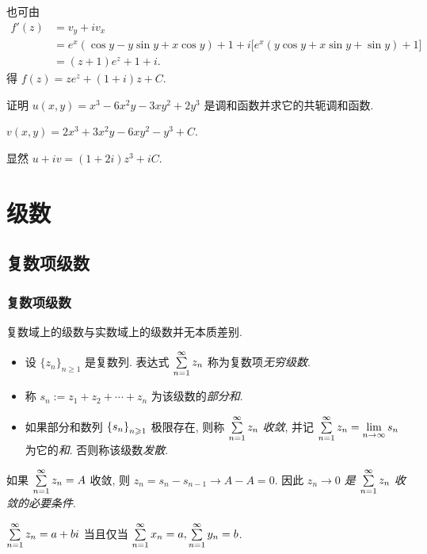 \documentclass[nocolor,theme=doremi,lang=cn,11pt,chinese,twoside,openright,usesamecnt]{elegantbook}
\begin{document}
也可由
\begin{align*}
	f'(z)&=v_y+iv_x\\
	&=e^x(\cos y-y\sin y+x\cos y)+1
	+i\bigl[e^x(y\cos y+x\sin y+\sin y)+1\bigr]\\
	&{=(z+1)e^z+1+i.}
\end{align*}
得 $f(z)=ze^z+(1+i)z+C$.
\begin{exercise}
	证明 $u(x,y)=x^3-6x^2y-3xy^2+2y^3$ 是调和函数并求它的共轭调和函数.
\end{exercise}

\begin{answer}
	$v(x,y)=2x^3+3x^2y-6xy^2-y^3+C$.
\end{answer}
显然 $u+iv=(1+2i)z^3+iC$.

\chapter{级数}
\section{复数项级数}

\subsection{复数项级数}

复数域上的级数与实数域上的级数并无本质差别.

\begin{definition}
	\begin{itemize}
		\item 设 $\{z_n\}_{n\ge1}$ 是复数列. 表达式 $\sum\limits_{n=1}^\infty z_n$ 称为复数项\emph{无穷级数}.
		\item 称 $s_n:=z_1+z_2+\cdots+z_n$ 为该级数的\emph{部分和}.
		\item 如果部分和数列 ${\left\{s_n\right\}}_{n\geqslant 1}$ 极限存在, 则称 $\sum\limits_{n=1}^\infty z_n$ \emph{收敛}, 并记 $\sum\limits_{n=1}^\infty z_n=\lim\limits_{n\to\infty}s_n$ 为它的\emph{和}. 否则称该级数\emph{发散}.
	\end{itemize}
\end{definition}

如果 $\sum\limits_{n=1}^\infty z_n=A$ 收敛, 则 $z_n=s_n-s_{n-1}\to A-A=0$.
因此 \emph{$z_n\to0$ 是 $\sum\limits_{n=1}^\infty z_n$ 收敛的必要条件}.

\begin{theorem}
	$\sum\limits_{n=1}^\infty z_n=a+bi$ 当且仅当 $\sum\limits_{n=1}^\infty x_n=a,\sum\limits_{n=1}^\infty y_n=b$.
\end{theorem}
\end{document}
